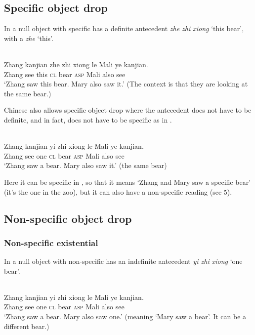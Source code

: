 \documentclass[output=paper]{LSP/langsci}
\begin{document}
\subsection{Specific object drop}


In  a null object with specific  has a definite antecedent \textit{zhe zhi xiong} ‘this bear’, with a  \textit{zhe} ‘this’.


\ea%
    \label{ex:li:3}
 \\
    \gll   Zhang  kanjian  zhe zhi xiong le   Mali   ye   kanjian.  \\
   Zhang   see       this \textsc{cl}  bear \textsc{asp}   Mali   also   see  	\\
    \glt `Zhang   saw this bear.  Mary also saw it.' (The context is that they are looking at the same bear.)
    \z


Chinese also allows specific object drop where the antecedent does not have to be definite, and in fact, does not have to be specific as in .


\ea%
    \label{ex:li:4}
    \\
    \gll	    Zhang  kanjian   yi zhi   xiong le   Mali   ye   kanjian.    \\
Zhang  see      one \textsc{cl}   bear \textsc{asp}   Mali   also   see  	\\
    \glt `Zhang saw a bear.  Mary also saw it.'   (the same bear)
    \z



Here it can be specific in , so that it means ‘Zhang and Mary saw a specific bear’ (it’s the one in the zoo), but it can also have a non-specific reading (see 5).


\subsection{Non-specific object drop}\label{sec:li:2.2}


\subsubsection{Non-specific existential}


In  a null object with non-specific  has an indefinite antecedent \textit{yi zhi xiong} ‘one bear’.


\ea%
    \label{ex:li:5}
\\
    \gll	     Zhang  kanjian yi zhi xiong le     Mali   ye   kanjian.    \\
	Zhang  see    one \textsc{cl} bear \textsc{asp}     Mali   also   see  \\
    \glt `Zhang saw a bear.  Mary also saw one.' (meaning ‘Mary saw a bear’. It can be a different bear.)
    \z
\end{document}

